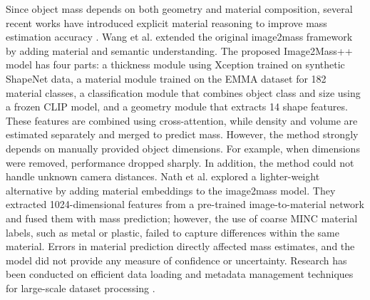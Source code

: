 \documentclass[journal,twoside,web]{ieeecolor}
\begin{document}
Since object mass depends on both geometry and material composition, several recent works have introduced explicit material reasoning to improve mass estimation accuracy \cite{wang2025image2mass++,nath2024mass}. Wang et al. \cite{wang2025image2mass++} extended the original image2mass framework by adding material and semantic understanding. The proposed Image2Mass++ model has four parts: a thickness module using Xception trained on synthetic ShapeNet data, a material module trained on the EMMA dataset for 182 material classes, a classification module that combines object class and size using a frozen CLIP model, and a geometry module that extracts 14 shape features. These features are combined using cross-attention, while density and volume are estimated separately and merged to predict mass. However, the method strongly depends on manually provided object dimensions. For example, when dimensions were removed, performance dropped sharply. In addition, the method could not handle unknown camera distances. Nath et al. \cite{nath2024mass} explored a lighter-weight alternative by adding material embeddings to the image2mass model. They extracted 1024-dimensional features from a pre-trained image-to-material network and fused them with mass prediction; however, the use of coarse MINC material labels, such as metal or plastic, failed to capture differences within the same material. Errors in material prediction directly affected mass estimates, and the model did not provide any measure of confidence or uncertainty. Research has been conducted on efficient data loading and metadata management techniques for large-scale dataset processing \cite{wang2025lafa, mohan2021temporal}.
\end{document}
